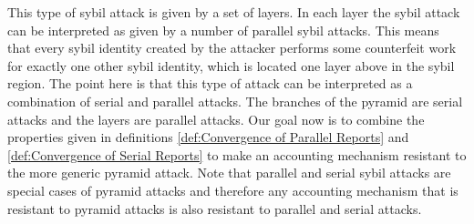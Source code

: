 \noindent{}This type of sybil attack is given by a set of layers. In each layer the sybil attack can be interpreted as given by a number of parallel sybil attacks. This means that every sybil identity created by the attacker performs some counterfeit work for exactly one other sybil identity, which is located one layer above in the sybil region. The point here is that this type of attack can be interpreted as a combination of serial and parallel attacks. The branches of the pyramid are serial attacks and the layers are parallel attacks. Our goal now is to combine the properties given in definitions \ref{def:Convergence of Parallel Reports} and \ref{def:Convergence of Serial Reports} to make an accounting mechanism resistant to the more generic pyramid attack. Note that parallel and serial sybil attacks are special cases of pyramid attacks and therefore any accounting mechanism that is resistant to pyramid attacks is also resistant to parallel and serial attacks. 

